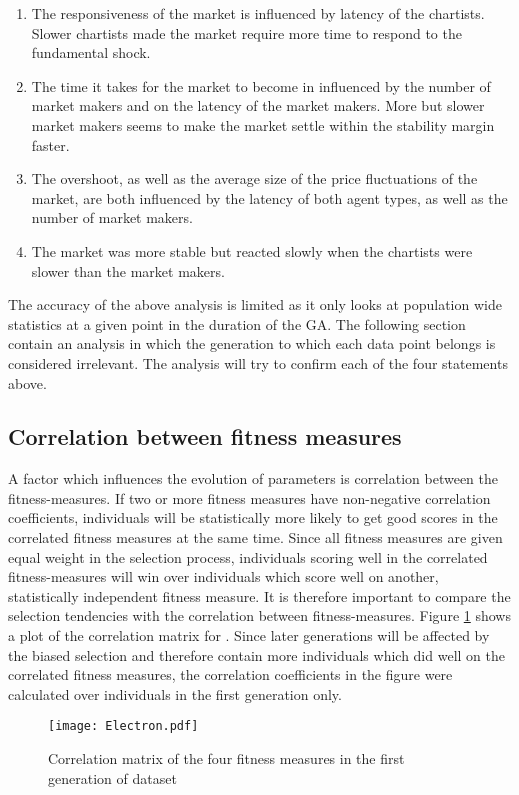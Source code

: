 \begin{enumerate}
\item The responsiveness of the market is influenced by latency of the chartists. Slower chartists made the market require more time to respond to the fundamental shock.
\item The time it takes for the market to become in influenced by the number of market makers and on the latency of the market makers. More but slower market makers seems to make the market settle within the stability margin faster.
\item The overshoot, as well as the average size of the price fluctuations of the market, are both influenced by the latency of both agent types, as well as the number of market makers.
\item The market was more stable but reacted slowly when the chartists were slower than the market makers.
\end{enumerate}
The accuracy of the above analysis is limited as it only looks at population wide statistics at a given point in the duration of the GA. The following section contain an analysis in which the generation to which each data point belongs is considered irrelevant. The analysis will try to confirm each of the four statements above.




\subsection{Correlation between fitness measures}\label{section:correlation_fitness}
A factor which influences the evolution of parameters is correlation between the fitness-measures. If two or more fitness measures have non-negative correlation coefficients, individuals will be statistically more likely to get good scores in the correlated fitness measures at the same time. Since all fitness measures are given equal weight in the selection process, individuals scoring well in the correlated fitness-measures will win over individuals which score well on another, statistically independent fitness measure. It is therefore important to compare the selection tendencies with the correlation between fitness-measures. Figure \ref{figure:d10_fitness_correlation} shows a plot of the correlation matrix for \dten. Since later generations will be affected by the biased selection and therefore contain more individuals which did well on the correlated fitness measures, the correlation coefficients in the figure were calculated over individuals in the first generation only.
\begin{figure}
\centering
\texttt{[image: Electron.pdf]}
\caption{Correlation matrix of the four fitness measures in the first generation of dataset \dten	}
\label{figure:d10_fitness_correlation}
\end{figure}

